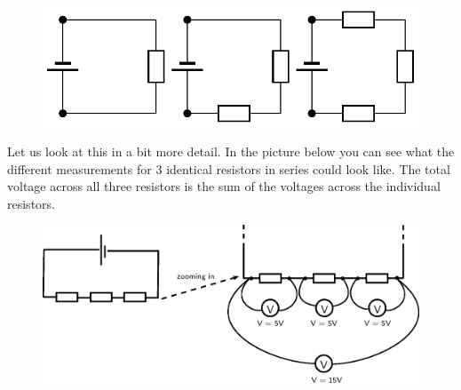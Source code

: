     \setcounter{subfigure}{0}


	\begin{figure}[H] %
    \begin{center}
    \label{m38776*id64087!!!underscore!!!media}\label{m38776*id64087!!!underscore!!!printimage}\includegraphics{col11305.imgs/m38776_PG10C9_018.png} %
        
      \vspace{2pt}
    \vspace{.1in}
    
    \end{center}

 \end{figure}   

    \addtocounter{footnote}{-0}
    
        \par 
        \label{m38776*id64094}Let us look at this in a bit more detail. In the picture below you can see what the different measurements for 3 identical resistors in series could look like. The total voltage across all three resistors is the sum of the voltages across the individual resistors. \par 
        \label{m38776*id64099}
          
    \setcounter{subfigure}{0}


	\begin{figure}[H] %
    \begin{center}
    \label{m38776*id64102!!!underscore!!!media}\label{m38776*id64102!!!underscore!!!printimage}\includegraphics{col11305.imgs/m38776_PG10C9_019.png} %
        
      \vspace{2pt}
    \vspace{.1in}
    
    \end{center}

 \end{figure}   

